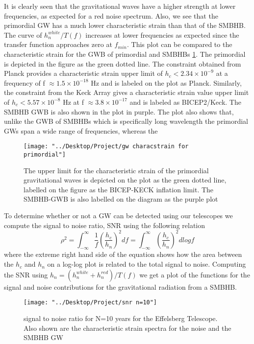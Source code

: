 \documentclass[12pt]{article}
\begin{document}
	It is clearly seen that the gravitational waves have a higher strength at lower frequencies, as expected for a red noise spectrum. Also, we see that the primordial GW has a much lower characteristic strain than that of the SMBHB. The curve of $h_{n}^{white}/T(f)$ increases at lower frequencies as expected since the transfer function approaches zero at $f_{min}$. This plot can be compared to the characteristic strain for the GWB of primordial and SMBHBs \ref{fig:gw_spectrum_for_primordial.png}. The primordial is depicted in the figure as the green dotted line. The constraint obtained from Planck provides a characteristic strain upper limit of $h_{c}<2.34 \times 10^{-9}$ at a frequency of f $ \approx 1.5 \times 10^{-18}$ Hz and is labeled on the plot as Planck. Similarly, the constraint from the Keck Array gives a characteristic strain value upper limit of $h_{c}<5.57 \times 10^{-8}$ Hz at f $\approx 3.8 \times 10^{-17}$ and is labeled as BICEP2/Keck. The SMBHB GWB is also shown in the plot in purple. The plot also shows that, unlike the GWB of SMBHBs which is specifically long wavelength the primordial GWs span a wide range of frequencies, whereas the       
\begin{figure}[th!]
	\texttt{[image: "../Desktop/Project/gw characstrain for primordial"]}
	\caption{\label{fig:gw_spectrum_for_primordial.png} The upper limit for the characteristic strain of the primordial gravitational waves is depicted on the plot as the green dotted line, labelled on the figure as the BICEP-KECK inflation limit. The SMBHB-GWB is also labelled on the diagram as the purple plot \cite{kuroda2015gravitational}}
\end{figure}

	To determine whether or not a GW can be detected using our telescopes we compute the signal to noise ratio, SNR using the following relation 
	\begin{equation}\label{snr eqn}
	\rho^2=\int_{-\infty}^{\infty}\frac{1}{f}{(\frac{h_c}{h_n})^2}df=\int_{-\infty}^{\infty}{(\frac{h_c}{h_n})^2}dlogf
	\end{equation}
	where the extreme right hand side of the equation shows how the area between the $h_c$ and $h_n$ on a log-log plot is related to the total signal to noise. Computing the SNR using $h_n=(h_n^{white}+h_n^{red})/T(f)$ we get a plot of the functions for the signal and noise contributions for the gravitational radiation from a SMBHB.
\begin{figure}[th!]
	\texttt{[image: "../Desktop/Project/snr n=10"]}
	\caption{\label{fig:snr_n_10.png} signal to noise ratio for N=10 years for the Effelsberg Telescope. Also shown are the characteristic strain spectra for the noise and the SMBHB GW}
\end{figure}	
	
\end{document}
